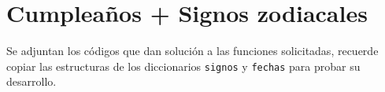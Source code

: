 \section{Cumpleaños + Signos zodiacales}
  Se adjuntan los códigos que dan solución a las funciones solicitadas, recuerde copiar las estructuras de los diccionarios \texttt{signos} y \texttt{fechas} para probar su desarrollo.
  
  
